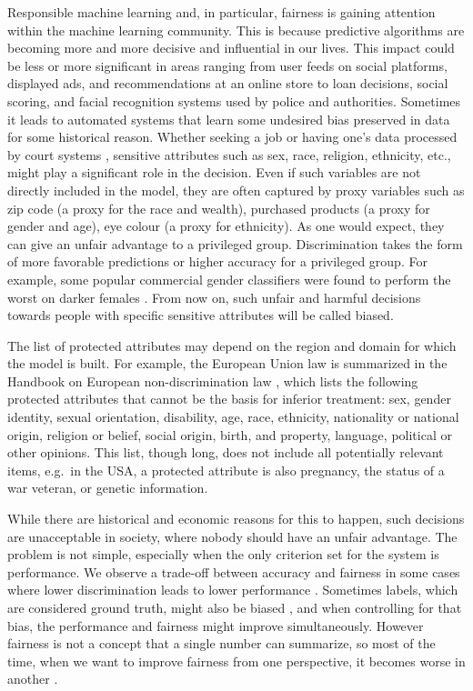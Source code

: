 Responsible machine learning and, in particular, fairness is gaining
attention within the machine learning community. This is because
predictive algorithms are becoming more and more decisive and
influential in our lives. This impact could be less or more significant
in areas ranging from user feeds on social platforms, displayed ads, and
recommendations at an online store to loan decisions, social scoring,
and facial recognition systems used by police and authorities. Sometimes
it leads to automated systems that learn some undesired bias preserved
in data for some historical reason. Whether seeking a job
\citep{8731591} or having one's data processed by court systems
\citep{propublica}, sensitive attributes such as sex, race, religion,
ethnicity, etc., might play a significant role in the decision. Even if
such variables are not directly included in the model, they are often
captured by proxy variables such as zip code (a proxy for the race and
wealth), purchased products (a proxy for gender and age), eye colour (a
proxy for ethnicity). As one would expect, they can give an unfair
advantage to a privileged group. Discrimination takes the form of more
favorable predictions or higher accuracy for a privileged group. For
example, some popular commercial gender classifiers were found to
perform the worst on darker females \citep{pmlr-v81-buolamwini18a}. From
now on, such unfair and harmful decisions towards people with specific
sensitive attributes will be called biased.

The list of protected attributes may depend on the region and domain for
which the model is built. For example, the European Union law is
summarized in the Handbook on European non-discrimination law
\citet{European-non-discrimination}, which lists the following protected
attributes that cannot be the basis for inferior treatment: sex, gender
identity, sexual orientation, disability, age, race, ethnicity,
nationality or national origin, religion or belief, social origin,
birth, and property, language, political or other opinions. This list,
though long, does not include all potentially relevant items, e.g.~in
the USA, a protected attribute is also pregnancy, the status of a war
veteran, or genetic information.

While there are historical and economic reasons for this to happen, such
decisions are unacceptable in society, where nobody should have an
unfair advantage. The problem is not simple, especially when the only
criterion set for the system is performance. We observe a trade-off
between accuracy and fairness in some cases where lower discrimination
leads to lower performance \citep{kamiran}. Sometimes labels, which are
considered ground truth, might also be biased \citep{labelwrong}, and
when controlling for that bias, the performance and fairness might
improve simultaneously. However fairness is not a concept that a single
number can summarize, so most of the time, when we want to improve
fairness from one perspective, it becomes worse in another
\citep{barocas-hardt-narayanan}.

